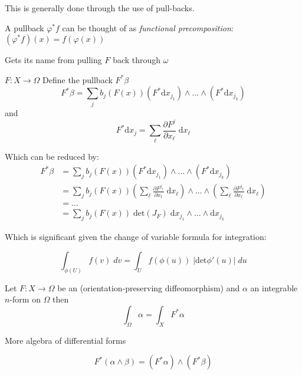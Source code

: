 This is generally done through the use of pull-backs.

A pullback $\varphi^* f$ can be thought of as \emph{functional precomposition}: $(\varphi^* f) (x) = f(\varphi(x))$


Gets its name from pulling $F$ back through $\omega$

\begin{definition}
$F: X \to \Omega$
Define the pullback $F^* \beta$
\begin{equation}
F^* \beta = \sum_j  b_j ( F(x)) (F^* \text{d}x_{j_1}) \wedge ... \wedge (F^* \text{d} x_{j_k})
\end{equation}
and
\begin{equation}
F^* \text{d}x_j = \sum_\ell \frac{\partial F^j}{\partial x_\ell} \; \text{d} x_\ell
\end{equation}
\end{definition}

Which can be reduced by:
\begin{align}
F^ * \beta & = \sum_j  b_j ( F(x)) (F^* \text{d}x_{j_1}) \wedge ... \wedge (F^* \text{d} x_{j_k}) \\
& = \sum_j  b_j ( F(x))  
\left( \sum_\ell \frac{\partial F^{j_1}}{\partial x_\ell} \; \text{d} x_\ell \right)
\wedge ... \wedge  
\left( \sum_\ell \frac{\partial F^{j_k}}{\partial x_\ell} \; \text{d} x_\ell \right) \\
& = ... \\
& = \sum_j b_j ( F(x)) \; \text{det}\left( J_F \right) \; \text{d}x_{j_1} \wedge ... \wedge \text{d} x_{j_k}
\end{align}

Which is significant given the change of variable formula for integration:

\begin{equation}
\int_{\phi(U)} \! f(v) \; dv = \int_U \! f(\phi(u)) \; |\text{det}\phi'(u)| \; du
\end{equation}

\begin{theorem}
Let $F : X  \to \Omega$ be an (orientation-preserving diffeomorphism) and $\alpha$ an integrable $n$-form on $\Omega$ then
\begin{equation}
\int_\Omega \alpha = \int_X F^* \alpha
\end{equation}
\end{theorem}

More algebra of differential forms

\begin{equation}
F^* (\alpha \wedge \beta ) = (F^* \alpha) \wedge (F^* \beta)
\end{equation}

